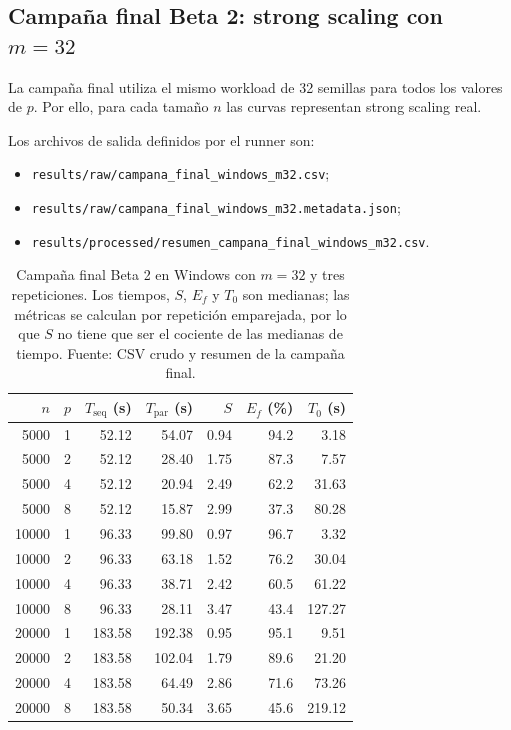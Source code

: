\documentclass[11pt,a4paper]{article}
\begin{document}
\subsection{Campaña final Beta 2: strong scaling con $m=32$}

La campaña final utiliza el mismo workload de 32 semillas para todos los valores de
$p$. Por ello, para cada tamaño $n$ las curvas representan strong scaling real.

Los archivos de salida definidos por el runner son:

\begin{itemize}[leftmargin=*]
    \item \texttt{results/raw/campana\_final\_windows\_m32.csv};
    \item \texttt{results/raw/campana\_final\_windows\_m32.metadata.json};
    \item \texttt{results/processed/resumen\_campana\_final\_windows\_m32.csv}.
\end{itemize}

\begin{table}[H]
\centering
\small
\begin{tabular}{rr r r r r r}
\toprule
$n$ & $p$ & $T_{\mathrm{seq}}$ (s) & $T_{\mathrm{par}}$ (s)
& $S$ & $E_f$ (\%) & $T_0$ (s) \\
\midrule
5000  & 1 & 52.12  & 54.07  & 0.94 & 94.2 & 3.18 \\
5000  & 2 & 52.12  & 28.40  & 1.75 & 87.3 & 7.57 \\
5000  & 4 & 52.12  & 20.94  & 2.49 & 62.2 & 31.63 \\
5000  & 8 & 52.12  & 15.87  & 2.99 & 37.3 & 80.28 \\
\midrule
10000 & 1 & 96.33  & 99.80  & 0.97 & 96.7 & 3.32 \\
10000 & 2 & 96.33  & 63.18  & 1.52 & 76.2 & 30.04 \\
10000 & 4 & 96.33  & 38.71  & 2.42 & 60.5 & 61.22 \\
10000 & 8 & 96.33  & 28.11  & 3.47 & 43.4 & 127.27 \\
\midrule
20000 & 1 & 183.58 & 192.38 & 0.95 & 95.1 & 9.51 \\
20000 & 2 & 183.58 & 102.04 & 1.79 & 89.6 & 21.20 \\
20000 & 4 & 183.58 & 64.49  & 2.86 & 71.6 & 73.26 \\
20000 & 8 & 183.58 & 50.34  & 3.65 & 45.6 & 219.12 \\
\bottomrule
\end{tabular}
\caption{Campaña final Beta 2 en Windows con $m=32$ y tres repeticiones.
Los tiempos, $S$, $E_f$ y $T_0$ son medianas; las métricas se calculan por
repetición emparejada, por lo que $S$ no tiene que ser el cociente de las
medianas de tiempo. Fuente: CSV crudo y resumen de la campaña final.}
\label{tab:campana-final-windows}
\end{table}
\end{document}
